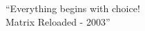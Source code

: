 \newpage
\thispagestyle{empty}

\vspace*{18cm}

\begin{flushright}
 ``Everything begins with choice! \\
 Matrix Reloaded - 2003'' \\
\end{flushright}
